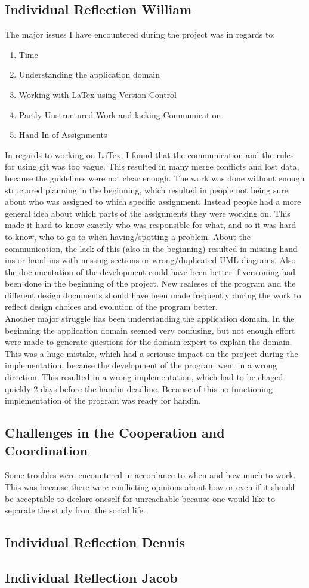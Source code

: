 \subsection{Individual Reflection William}
The major issues I have encountered during the project was in regards to:
\begin{enumerate}
	\item Time
	\item Understanding the application domain
	\item Working with LaTex using Version Control
	\item Partly Unstructured Work and lacking Communication
	\item Hand-In of Assignments
\end{enumerate}
In regards to working on LaTex, I found that the communication and the rules for using git was too vague. This resulted in many merge conflicts and lost data, because the guidelines were not clear enough.
The work was done without enough structured planning in the beginning, which resulted in people not being sure about who was assigned to which specific assignment. Instead people had a more general idea about which parts of the assignments they were working on. This made it hard to know exactly who was responsible for what, and so it was hard to know, who to go to when having/spotting a problem. About the communication, the lack of this (also in the beginning) resulted in missing hand ins or hand ins with missing sections or wrong/duplicated UML diagrams.
Also the documentation of the development could have been better if versioning had been done in the beginning of the project. New realeses of the program and the different design documents should have been made frequently during the work to reflect design choices and evolution of the program better.\\
Another major struggle has been understanding the application domain. In the beginning the application domain seemed very confusing, but not enough effort were made to generate questions for the domain expert to explain the domain. This was a huge mistake, which had a seriouse impact on the project during the implementation, because the development of the program went in a wrong direction. This resulted in a wrong implementation, which had to be chaged quickly 2 days before the handin deadline. Because of this no functioning implementation of the program was ready for handin.

\subsection{Challenges in the Cooperation and Coordination}
Some troubles were encountered in accordance to when and how much to work. This was because there were conflicting opinions about how or even if it should be acceptable to declare oneself for unreachable because one would like to separate the study from the social life.
\pagebreak

\subsection{Individual Reflection Dennis}

\pagebreak
\subsection{Individual Reflection Jacob}